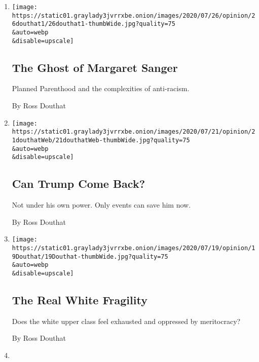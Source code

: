 \begin{enumerate}
\def\labelenumi{\arabic{enumi}.}
\item
  \href{/2020/07/25/opinion/sunday/abortion-racism-margaret-sanger.html}{}

  \texttt{[image: https://static01.graylady3jvrrxbe.onion/images/2020/07/26/opinion/26douthat1/26douthat1-thumbWide.jpg?quality=75\\\&auto=webp\\\&disable=upscale]}

  \hypertarget{the-ghost-of-margaret-sanger}{%
  \subsection{The Ghost of Margaret
  Sanger}\label{the-ghost-of-margaret-sanger}}

  Planned Parenthood and the complexities of anti-racism.

  By Ross Douthat
\item
  \href{/2020/07/21/opinion/trump-polls-election-2020.html}{}

  \texttt{[image: https://static01.graylady3jvrrxbe.onion/images/2020/07/21/opinion/21douthatWeb/21douthatWeb-thumbWide.jpg?quality=75\\\&auto=webp\\\&disable=upscale]}

  \hypertarget{can-trump-come-back}{%
  \subsection{Can Trump Come Back?}\label{can-trump-come-back}}

  Not under his own power. Only events can save him now.

  By Ross Douthat
\item
  \href{/2020/07/18/opinion/sunday/white-fragility-meritocracy.html}{}

  \texttt{[image: https://static01.graylady3jvrrxbe.onion/images/2020/07/19/opinion/19Douthat/19Douthat-thumbWide.jpg?quality=75\\\&auto=webp\\\&disable=upscale]}

  \hypertarget{the-real-white-fragility}{%
  \subsection{The Real White Fragility}\label{the-real-white-fragility}}

  Does the white upper class feel exhausted and oppressed by
  meritocracy?

  By Ross Douthat
\item
  \href{/2020/07/14/opinion/cancel-culture-.html}{}


\end{enumerate}
